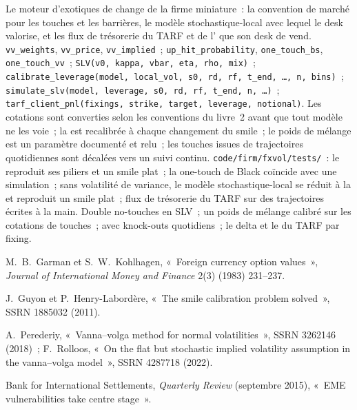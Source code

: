 \begin{build}
 Le moteur d'exotiques de change de la firme miniature~: la convention de marché pour les touches et les barrières, le modèle stochastique-local avec lequel le
desk valorise, et les flux de trésorerie du TARF et de l' que son desk de  vend.
 \texttt{vv\_weights}, \texttt{vv\_price}, \texttt{vv\_implied}~; \texttt{up\_hit\_probability}, \texttt{one\_touch\_bs},
\texttt{one\_touch\_vv}~; \texttt{SLV(v0, kappa, vbar, eta, rho, mix)}~; \texttt{calibrate\_leverage(model, local\_vol, s0, rd, rf, t\_end,
\ldots, n, bins)}~; \texttt{simulate\_slv(model, leverage, s0, rd, rf, t\_end, n, \ldots)}~; \texttt{tarf\_client\_pnl(fixings, strike, target,
leverage, notional)}.
 Les cotations sont converties selon les conventions du livre~2 avant que tout modèle ne les voie~; la  est recalibrée à chaque
changement du smile~; le poids de mélange est un paramètre documenté et relu~; les touches issues de trajectoires quotidiennes sont décalées vers un suivi continu.
 \texttt{code/firm/fxvol/tests/}~: le  reproduit ses piliers et un smile plat~; la one-touch de Black coïncide avec une
simulation~; sans volatilité de variance, le modèle stochastique-local se réduit à la  et reproduit un smile plat~; flux de trésorerie du TARF sur des
trajectoires écrites à la main.
 Double no-touches en SLV~; un poids de mélange calibré sur les cotations de touches~;  avec knock-outs quotidiens~; le delta et le
 du TARF par fixing.
\end{build}

\begin{omsources}
\item M.~B.~Garman et S.~W.~Kohlhagen, «~Foreign currency option values~», \emph{Journal of International Money and Finance} 2(3) (1983)
231--237.
\item J.~Guyon et P.~Henry-Labordère, «~The smile calibration problem solved~», SSRN 1885032 (2011).
\item A.~Perederiy, «~Vanna--volga method for normal volatilities~», SSRN 3262146 (2018)~; F.~Rolloos, «~On the flat but stochastic implied
volatility assumption in the vanna--volga model~», SSRN 4287718 (2022).
\item Bank for International Settlements, \emph{Quarterly Review} (septembre 2015), «~EME vulnerabilities take centre stage~».
\end{omsources}

